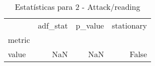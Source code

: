 \begin{table}[htbp]
\caption{Estatísticas para 2 - Attack/reading}
\label{tab:2_-_attack_reading_adf_test}
\begin{tabular}{lrrr}
\toprule
 & adf_stat & p_value & stationary \\
metric &  &  &  \\
\midrule
value & NaN & NaN & False \\
\bottomrule
\end{tabular}
\end{table}
